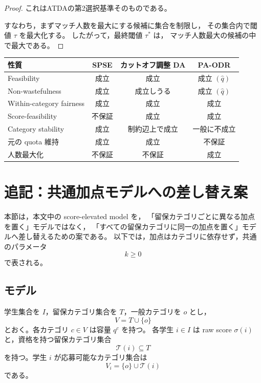 \documentclass[
  12pt,
  a4paper,
  oneside,
  onecolumn,
  titlepage,
  final
]{jsarticle}
\newcommand{\1}{\mathbf{1}}
\begin{document}
\begin{proof}
これは\textsc{ATDA}の第2選択基準そのものである。

すなわち，まずマッチ人数を最大にする候補に集合を制限し，
その集合内で閾値 $\tau$ を最大化する。
したがって，最終閾値 $\tau^\ast$ は，
マッチ人数最大の候補の中で最大である。
\end{proof}

  \begin{center}
  \begin{tabular}{lccc}
    \toprule
    性質 & SPSE & カットオフ調整 DA & PA-ODR \\
    \midrule
    Feasibility
      & 成立 & 成立 & 成立 $(\hat q)$ \\
    Non-wastefulness
      & 成立 & 成立しうる& 成立 $(\hat q)$ \\
    Within-category fairness
      & 成立 & 成立 & 成立 \\
    Score-feasibility
      & 不保証 & 成立 & 成立 \\
    Category stability
      & 成立 & 制約辺上で成立 & 一般に不成立 \\
    元の quota 維持
      & 成立 & 成立 & 不保証 \\
    人数最大化
      & 不保証 & 不保証 & 成立 \\
    \bottomrule
  \end{tabular}
  \end{center}

\clearpage
\section{追記：共通加点モデルへの差し替え案}
\label{sec:common-bonus-revision}

本節は，本文中の score-elevated model を，
「留保カテゴリごとに異なる加点を置く」モデルではなく，
「すべての留保カテゴリに同一の加点を置く」モデルへ差し替えるための案である。
以下では，加点はカテゴリに依存せず，共通のパラメータ
\[
    k\ge 0
\]
で表される。

\subsection{モデル}

学生集合を $I$，留保カテゴリ集合を $T$，一般カテゴリを $o$ とし，
\[
    V=T\cup\{o\}
\]
とおく。各カテゴリ $c\in V$ は容量 $q^c$ を持つ。
各学生 $i\in I$ は raw score $\sigma(i)$ と，資格を持つ留保カテゴリ集合
\[
    \mathcal T(i)\subseteq T
\]
を持つ。学生 $i$ が応募可能なカテゴリ集合は
\[
    V_i=\{o\}\cup\mathcal T(i)
\]
である。
\end{document}
